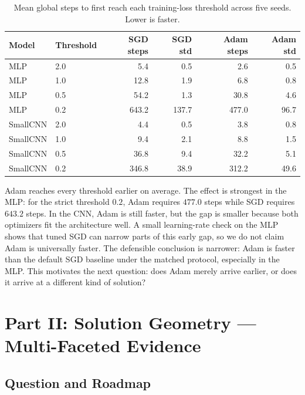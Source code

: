 \documentclass[11pt]{article}
\begin{document}
\begin{table}[H]
\centering
\begin{tabular}{llrrrr}
\toprule
\textbf{Model} & \textbf{Threshold} & \textbf{SGD steps} & \textbf{SGD std} & \textbf{Adam steps} & \textbf{Adam std}\\
\midrule
MLP & 2.0 & 5.4 & 0.5 & 2.6 & 0.5\\
MLP & 1.0 & 12.8 & 1.9 & 6.8 & 0.8\\
MLP & 0.5 & 54.2 & 1.3 & 30.8 & 4.6\\
MLP & 0.2 & 643.2 & 137.7 & 477.0 & 96.7\\
\midrule
SmallCNN & 2.0 & 4.4 & 0.5 & 3.8 & 0.8\\
SmallCNN & 1.0 & 9.4 & 2.1 & 8.8 & 1.5\\
SmallCNN & 0.5 & 36.8 & 9.4 & 32.2 & 5.1\\
SmallCNN & 0.2 & 346.8 & 38.9 & 312.2 & 49.6\\
\bottomrule
\end{tabular}
\caption{Mean global steps to first reach each training-loss threshold across five seeds. Lower is faster.}
\label{tab:q1_thresholds}
\end{table}

Adam reaches every threshold earlier on average. The effect is strongest in the MLP: for the strict threshold $0.2$, Adam requires $477.0$ steps while SGD requires $643.2$ steps. In the CNN, Adam is still faster, but the gap is smaller because both optimizers fit the architecture well. A small learning-rate check on the MLP shows that tuned SGD can narrow parts of this early gap, so we do not claim Adam is universally faster. The defensible conclusion is narrower: Adam is faster than the default SGD baseline under the matched protocol, especially in the MLP. This motivates the next question: does Adam merely arrive earlier, or does it arrive at a different kind of solution?

\FloatBarrier

\section{Part II: Solution Geometry --- Multi-Faceted Evidence}
\label{sec:part2}

\subsection{Question and Roadmap}
\end{document}
